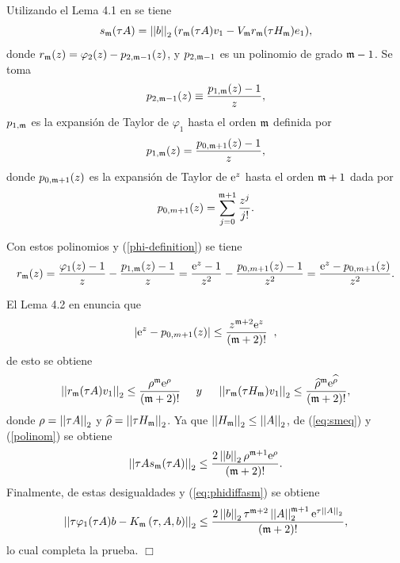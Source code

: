Utilizando el Lema 4.1 en \cite{Saad92} se tiene
\begin{equation}
s_{\mathfrak{m}}(\tau A)=\left\lvert \left\lvert b \right\rvert \right\rvert_2 ( r_{\mathfrak{m}}(\tau A)v_1-V_{\mathfrak{m}} r_{\mathfrak{m}}(\tau H_{\mathfrak{m}})e_1) ,\label{eq:smeq}
\end{equation}
donde $r_{\mathfrak{m}}(z) = \varphi_{2}(z)-p_{2,\mathfrak{m}-1}(z)$, y $p_{2,\mathfrak{m}-1}$ es un polinomio de grado $\mathfrak{m}-1$. Se toma 
\begin{equation*}
p_{2,\mathfrak{m}-1}(z)\equiv \frac{p_{1,\mathfrak{m}}(z)-1}{z},
\end{equation*}
$p_{1,\mathfrak{m}}$ es la expansión de Taylor de $\varphi_1$ hasta el orden  $\mathfrak{m}$
definida por
\[ p_{1,\mathfrak{m}}(z)= \frac{p_{0,\mathfrak{m}+1}(z)-1}{z}, \]
donde $p_{0,\mathfrak{m}+1}(z)$  es la expansión de Taylor de $\mathrm{e}^{z}$ hasta el orden $\mathfrak{m}+1$ dada por
\[ p_{0,m+1}(z)=\sum\limits^{\mathfrak{m}+1}_{j=0}\frac{z^j}{j!}. \]

Con estos polinomios y (\ref{phi-definition}) se tiene
\begin{equation*}
r_{\mathfrak{m}}(z) = \frac{\varphi_1(z)-1}{z}-\frac{p_{1,\mathfrak{m}}(z)-1}{z}=\frac{\mathrm{e}^{z}-1}{z^2}-\frac{p_{0,m+1}(z)-1}{z^2}
=\frac{\mathrm{e}^{z}-p_{0,m+1}(z)}{z^2}.
\end{equation*}

El Lema 4.2 en \cite{Saad92} enuncia que
\[ \left\lvert \mathrm{e}^{z}-p_{0,m+1}(z) \right\rvert \leq \frac{z^{\mathfrak{m}+2}\mathrm{e}^{z}}{(\mathfrak{m}+2)!}\;\;, \]
de esto se obtiene
\begin{equation}
\left\lvert \left\lvert r_{\mathfrak{m}}(\tau A)v_1 \right\rvert \right\rvert_2\leq \frac{\rho^{\mathfrak{m}}\mathrm{e}^{\rho}}{(\mathfrak{m}+2)!}\;\;\;\;\; y \;\;\;\;\; \left\lvert \left\lvert r_{\mathfrak{m}}(\tau H_{\mathfrak{m}})v_1 \right\rvert \right\rvert_2\leq \frac{\widehat{\rho}^{\mathfrak{m}}\mathrm{e}^{\widehat{\rho}}}{(\mathfrak{m}+2)!}, \label{polinom}
\end{equation}
donde $\rho=\left\lvert \left\lvert \tau A \right\rvert \right\rvert_2 $ y  $\widehat{\rho}=\left\lvert \left\lvert \tau H_{\mathfrak{m}} \right\rvert \right\rvert_2$. Ya que $\left\lvert \left\lvert H_{\mathfrak{m}} \right\rvert \right\rvert_2\leq\left\lvert \left\lvert A \right\rvert \right\rvert_2$, de (\ref{eq:smeq}) y (\ref{polinom}) se obtiene
\begin{equation*}
\left\lvert \left\lvert \tau As_{\mathfrak{m}}(\tau A) \right\rvert \right\rvert_2  \leq \frac{2 \left\lvert \left\lvert b \right\rvert \right\rvert_2\rho^{\mathfrak{m}+1}\mathrm{e}^{\rho}}{(\mathfrak{m}+2)!}.
\end{equation*}
Finalmente, de estas desigualdades y (\ref{eq:phidiffasm}) se obtiene
\begin{equation*}
\left\lvert \left\lvert \tau\varphi_1(\tau A)b - K_{\mathfrak{m}}\left(\tau,A , b \right) \right\rvert \right\rvert_2  \leq
\frac{2 \left\lvert \left\lvert b \right\rvert \right\rvert_2\tau^{\mathfrak{m}+2}\left\lvert \left\lvert A \right\rvert \right\rvert_2^{\mathfrak{m}+1}\mathrm{e}^{\tau \left\lvert \left\lvert A \right\rvert \right\rvert_2}}{(\mathfrak{m}+2)!},
\end{equation*}
lo cual completa la prueba. $\Box$

